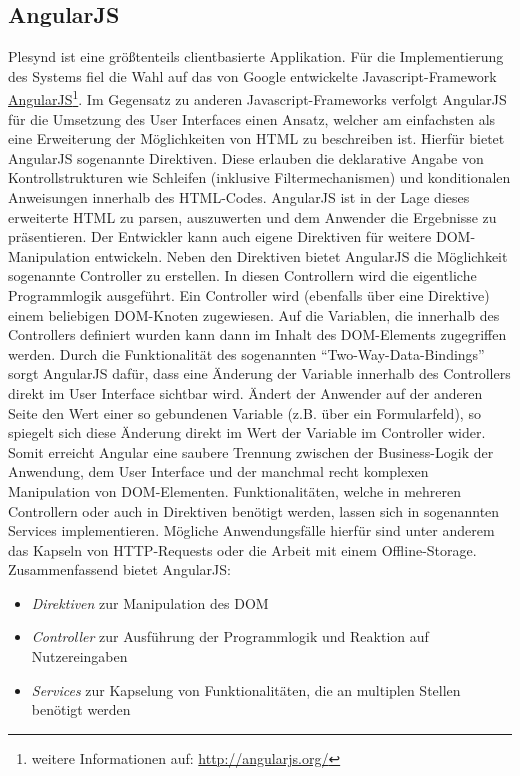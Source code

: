 \subsection{AngularJS}\label{section:angularjs}
Plesynd ist eine größtenteils clientbasierte Applikation. Für die Implementierung des Systems fiel die Wahl auf das von Google entwickelte Javascript-Framework \href{http://angularjs.org/}{AngularJS}\footnote{weitere Informationen auf: \url{http://angularjs.org/}}. Im Gegensatz zu anderen Javascript-Frameworks verfolgt AngularJS für die Umsetzung des User Interfaces einen Ansatz, welcher am einfachsten als eine Erweiterung der Möglichkeiten von \ac{HTML} zu beschreiben ist. Hierfür bietet AngularJS sogenannte Direktiven. Diese erlauben die deklarative Angabe von Kontrollstrukturen wie Schleifen (inklusive Filtermechanismen) und konditionalen Anweisungen innerhalb des \ac{HTML}-Codes. AngularJS ist in der Lage dieses erweiterte \ac{HTML} zu parsen, auszuwerten und dem Anwender die Ergebnisse zu präsentieren. Der Entwickler kann auch eigene Direktiven für weitere \ac{DOM}-Manipulation entwickeln. Neben den Direktiven bietet AngularJS die Möglichkeit sogenannte Controller zu erstellen. In diesen Controllern wird die eigentliche Programmlogik ausgeführt. Ein Controller wird (ebenfalls über eine Direktive) einem beliebigen \ac{DOM}-Knoten zugewiesen. Auf die Variablen, die innerhalb des Controllers definiert wurden kann dann im Inhalt des \ac{DOM}-Elements zugegriffen werden. Durch die Funktionalität des sogenannten "`Two-Way-Data-Bindings"' sorgt AngularJS dafür, dass eine Änderung der Variable innerhalb des Controllers direkt im User Interface sichtbar wird. Ändert der Anwender auf der anderen Seite den Wert einer so gebundenen Variable (z.B. über ein Formularfeld), so spiegelt sich diese Änderung direkt im Wert der Variable im Controller wider. Somit erreicht Angular eine saubere Trennung zwischen der Business-Logik der Anwendung, dem User Interface und der manchmal recht komplexen Manipulation von \ac{DOM}-Elementen. Funktionalitäten, welche in mehreren Controllern oder auch in Direktiven benötigt werden, lassen sich in sogenannten Services implementieren. Mögliche Anwendungsfälle hierfür sind unter anderem das Kapseln von \ac{HTTP}-Requests oder die Arbeit mit einem Offline-Storage. Zusammenfassend bietet AngularJS:
\begin{itemize}
 \item \emph{Direktiven} zur Manipulation des \ac{DOM}
 \item \emph{Controller} zur Ausführung der Programmlogik und Reaktion auf Nutzereingaben
 \item \emph{Services} zur Kapselung von Funktionalitäten, die an multiplen Stellen benötigt werden
\end{itemize}
